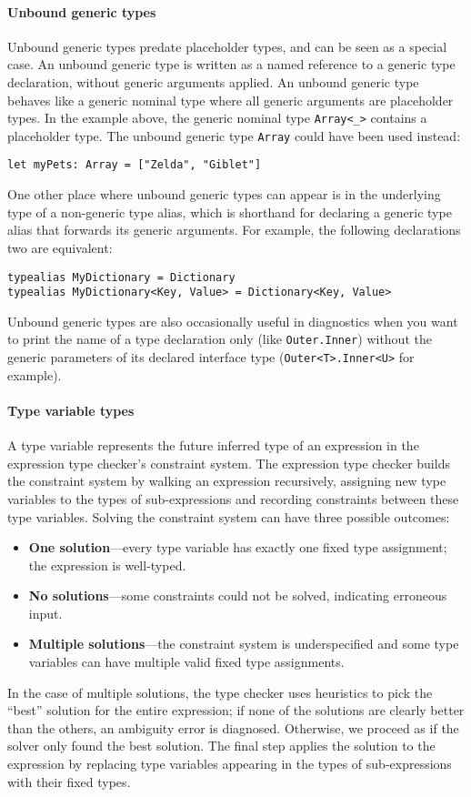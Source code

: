 \documentclass[a4paper,headsepline,bibliography=totoc,toc=flat,fleqn,twoside=semi]{scrbook}
\theoremstyle{definition}
\theoremstyle{definition}
\theoremstyle{definition}
\begin{document}
\paragraph{Unbound generic types}
Unbound generic types predate placeholder types, and can be seen as a special case. An unbound generic type is written as a named reference to a generic type declaration, without generic arguments applied. An unbound generic type behaves like a generic nominal type where all generic arguments are placeholder types. In the example above, the generic nominal type \texttt{Array<\_>} contains a placeholder type. The unbound generic type \texttt{Array} could have been used instead:
\begin{Verbatim}
let myPets: Array = ["Zelda", "Giblet"]
\end{Verbatim}
One other place where unbound generic types can appear is in the underlying type of a non-generic type alias, which is shorthand for declaring a generic type alias that forwards its generic arguments. For example, the following declarations two are equivalent:
\begin{Verbatim}
typealias MyDictionary = Dictionary
typealias MyDictionary<Key, Value> = Dictionary<Key, Value>
\end{Verbatim}
Unbound generic types are also occasionally useful in diagnostics when you want to print the name of a type declaration only (like \texttt{Outer.Inner}) without the generic parameters of its declared interface type (\texttt{Outer<T>.Inner<U>} for example).

\paragraph{Type variable types}
A type variable represents the future inferred type of an expression in the expression type checker's constraint system. The expression type checker builds the constraint system by walking an expression recursively, assigning new type variables to the types of sub-expressions and recording constraints between these type variables. Solving the constraint system can have three possible outcomes:
\begin{itemize}
\item \textbf{One solution}---every type variable has exactly one fixed type assignment; the expression is well-typed.
\item \textbf{No solutions}---some constraints could not be solved, indicating erroneous input.
\item \textbf{Multiple solutions}---the constraint system is underspecified and some type variables can have multiple valid fixed type assignments.
\end{itemize}
In the case of multiple solutions, the type checker uses heuristics to pick the ``best'' solution for the entire expression; if none of the solutions are clearly better than the others, an ambiguity error is diagnosed. Otherwise, we proceed as if the solver only found the best solution. The final step applies the solution to the expression by replacing type variables appearing in the types of sub-expressions with their fixed types.
\end{document}
